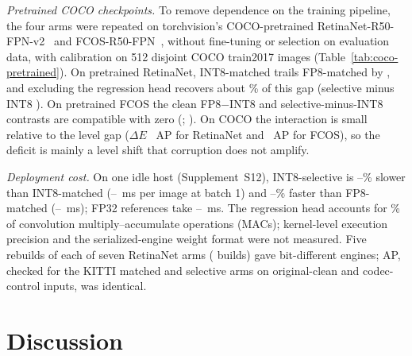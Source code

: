 \documentclass[a4paper,fleqn]{cas-dc}
\newcommand{\sigstar}{\textsuperscript{*}}
\newcommand{\Jclean}{\mathrm{J95}}
\begin{document}
\emph{Pretrained COCO checkpoints.} To remove dependence on the training pipeline, the four arms were repeated on torchvision's COCO-pretrained RetinaNet-R50-FPN-v2~\citep{torchvision2026retinanet} and FCOS-R50-FPN~\citep{torchvision2026fcos}, without fine-tuning or selection on evaluation data, with calibration on 512 disjoint COCO train2017 images (Table~\ref{tab:coco-pretrained}). On pretrained RetinaNet, INT8-matched trails FP8-matched by \nnCpFmJRet{}, and excluding the regression head recovers about \nnCpRecovRet{}\% of this gap (selective minus INT8 \nnCpSmJRet). On pretrained FCOS the clean FP8$-$INT8 and selective-minus-INT8 contrasts are compatible with zero (\nnCpFmJFco; \nnCpSmJFco). On COCO the interaction is small relative to the level gap ($\Delta E$ \nnCpFmDERet~AP for RetinaNet and \nnCpFmDEFco~AP for FCOS), so the deficit is mainly a level shift that corruption does not amplify.

\begin{table}[t]
\centering
\caption{Replication on pretrained checkpoints, COCO val2017 (paired 2,000-image subset; 95\% paired-bootstrap intervals, unadjusted). Arm rows give $\Jclean$ clean AP and corrupt-mean AP. Contrast rows give the difference on the $\Jclean$ basis (column~3) and the interaction $\Delta E$ (column~4). \sigstar{}: interval excludes zero.}
\label{tab:coco-pretrained}
\scriptsize
\setlength{\tabcolsep}{2pt}

\end{table}

\emph{Deployment cost.} On one idle host (Supplement~S12), INT8-selective is \nnLatSelOverheadMin--\nnLatSelOverheadMax\% slower than INT8-matched (\nnLatIntEightMin--\nnLatIntEightMax~ms per image at batch 1) and \nnLatSelVsFpEightMin--\nnLatSelVsFpEightMax\% faster than FP8-matched (\nnLatFpEightMin--\nnLatFpEightMax~ms); FP32 references take \nnLatFpMin--\nnLatFpMax~ms. The regression head accounts for \nnRegHeadMac\% of convolution multiply--accumulate operations (MACs); kernel-level execution precision and the serialized-engine weight format were not measured. Five rebuilds of each of seven RetinaNet arms (\nnRbTotal{} builds) gave bit-different engines; AP, checked for the KITTI matched and selective arms on original-clean and codec-control inputs, was identical.

\section{Discussion}
\label{sec:discussion}
\end{document}
